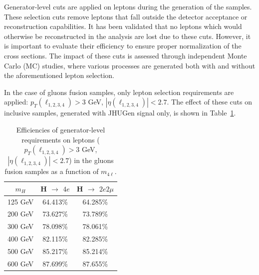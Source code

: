 
Generator-level cuts are applied on leptons during the generation of the samples.
These selection cuts remove leptons that fall outside the detector acceptance or reconstruction capabilities. It has been validated that no leptons which would otherwise be reconstructed in the analysis are lost due to these cuts. However, it is important to evaluate their efficiency to ensure proper normalization of the cross sections. The impact of these cuts is assessed through independent Monte Carlo (MC) studies, where various processes are generated both with and without the aforementioned lepton selection. 

In the case of gluons fusion \offshell samples, only lepton selection requirements are applied:
\noindent $p_T(\ell_{1,2,3,4})> 3$ GeV, $|\eta(\ell_{1,2,3,4})| < 2.7$.
The effect of these cuts on inclusive samples, generated with JHUGen signal only, 
is shown in Table~\ref{tab:ggHlepteff}.

\begin{table}[!hbt]
\begin{center}
\begin{tabular}{|c|c|c|}
\hline
$m_H$ & H $\rightarrow$ $4e$ & H $\rightarrow$ $2e2\mu$ \\ 
\hline
125 GeV  & 64.413\%           & 64.285\%              \\ 
200 GeV  & 73.627\%           & 73.789\%              \\ 
300 GeV  & 78.098\%           & 78.061\%              \\ 
400 GeV  & 82.115\%           & 82.285\%              \\ 
500 GeV  & 85.217\%           & 85.214\%              \\ 
600 GeV  & 87.699\%           & 87.655\%              \\ 
\hline
\end{tabular}
\caption{
Efficiencies of generator-level requirements on leptons ($p_T(\ell_{1,2,3,4})> 3$ GeV, $|\eta(\ell_{1,2,3,4})| < 2.7$)
in the \offshell gluons fusion samples as a function of $m_{4\ell}$.
}
\label{tab:ggHlepteff}
\end{center}
\end{table}



